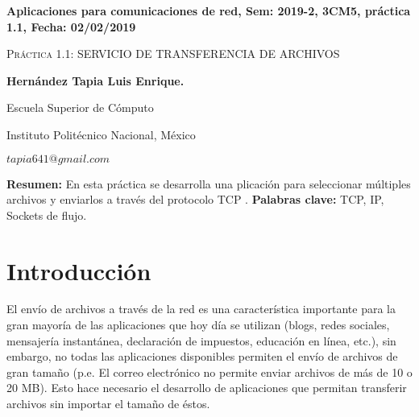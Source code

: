 \documentclass[12pt,twoside]{article}
\date{}
\begin{document}
\centerline{\bf Aplicaciones para comunicaciones de red, Sem: 2019-2, 3CM5, pr\'actica 1.1, Fecha: 02/02/2019}
\centerline{}
\centerline{}
\begin{center}
\Large{\textsc{Pr\'actica 1.1: SERVICIO DE TRANSFERENCIA DE ARCHIVOS}}
\end{center}
\centerline{}
\centerline{\bf {Hern\'andez Tapia Luis Enrique.}}
\centerline{}
\centerline{Escuela Superior de C\'omputo}
\centerline{Instituto Polit\'ecnico Nacional, M\'exico}
\centerline{$tapia641@gmail.com$}
\newtheorem{Theorem}{\quad Theorem}[section]
\newtheorem{Definition}[Theorem]{\quad Definition}
\newtheorem{Corollary}[Theorem]{\quad Corollary}
\newtheorem{Lemma}[Theorem]{\quad Lemma}
\newtheorem{Example}[Theorem]{\quad Example}
\bigskip

\textbf{Resumen:} En esta pr\'actica se desarrolla una plicaci\'on para seleccionar m\'ultiples archivos y enviarlos a trav\'es del protocolo TCP \newline.
\textbf{\newline Palabras clave:} TCP, IP, Sockets de flujo.



\section{Introducci\'on}

El env\'io de archivos a trav\'es de la red es una caracter\'istica importante para la gran mayor\'ia de las aplicaciones que hoy d\'ia se utilizan (blogs, redes sociales, mensajer\'ia instant\'anea, declaraci\'on de impuestos, educaci\'on en l\'inea, etc.), sin embargo, no todas las aplicaciones disponibles permiten el env\'io de archivos de gran tama\~no (p.e. El correo electr\'onico no permite enviar archivos de m\'as de 10 o 20 MB).
Esto hace necesario el desarrollo de aplicaciones que permitan transferir archivos sin importar el tamaño de \'estos.

\newpage
\end{document}
